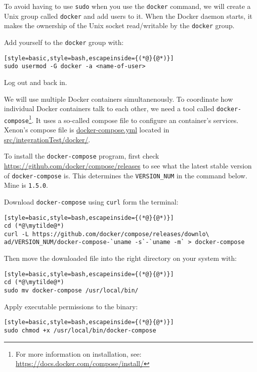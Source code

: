 To avoid having to use \texttt{sudo} when you use the \texttt{docker} command, we will create a Unix group called \texttt{docker} and add users to it. When the Docker daemon starts, it makes the ownership of the Unix socket read/writable by the \texttt{docker} group.

Add yourself to the \texttt{docker} group with:
\begin{lstlisting}[style=basic,style=bash,escapeinside={(*@}{@*)}]
sudo usermod -G docker -a <name-of-user>
\end{lstlisting}
Log out and back in.

We will use multiple Docker containers simultanenously. To coordinate how individual Docker containers talk to each other, we need a tool called \texttt{docker-compose}\footnote{For more information on installation, see: \url{https://docs.docker.com/compose/install/}}. It uses
a so-called compose file to configure an container's services. Xenon's compose file is \url{docker-compose.yml} located in \url{src/integrationTest/docker/}.

To install the \texttt{docker-compose} program, first check \url{https://github.com/docker/compose/releases} to see what the latest stable version of \texttt{docker-compose} is. This determines the \texttt{VERSION\_NUM} in the command below. Mine is \texttt{1.5.0}.

Download \texttt{docker-compose} using \texttt{curl} form the terminal:
\begin{lstlisting}[style=basic,style=bash,escapeinside={(*@}{@*)}]
cd (*@\mytilde@*)
curl -L https://github.com/docker/compose/releases/downlo\
ad/VERSION_NUM/docker-compose-`uname -s`-`uname -m` > docker-compose
\end{lstlisting}

Then move the downloaded file into the right directory on your system with:
\begin{lstlisting}[style=basic,style=bash,escapeinside={(*@}{@*)}]
cd (*@\mytilde@*)
sudo mv docker-compose /usr/local/bin/
\end{lstlisting}

Apply executable permissions to the binary:
\begin{lstlisting}[style=basic,style=bash,escapeinside={(*@}{@*)}]
sudo chmod +x /usr/local/bin/docker-compose
\end{lstlisting}

